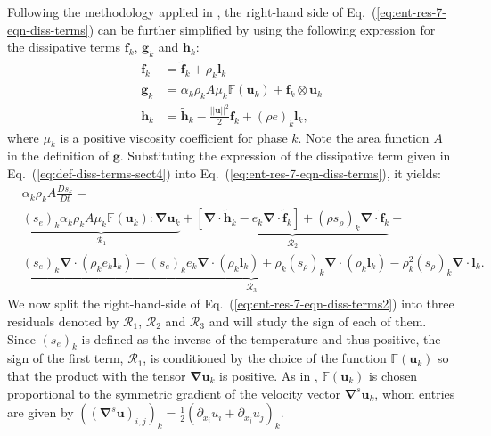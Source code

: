 \documentclass[preprint,10pt]{elsarticle}
\renewcommand{\div}{\mbold{\nabla}\! \cdot \!}
\newcommand{\grad}{\mbold{\nabla}}
\newcommand{\mbold}[1]{\boldsymbol#1}
\newcommand{\eqt}[1]{Eq.~(\ref{#1})}                     %
\begin{document}
Following the methodology applied in \cite{jlg, Marco_paper_low_mach}, the right-hand side of \eqt{eq:ent-res-7-eqn-diss-terms} can be further simplified by using the following expression
for the dissipative terms $\mbold f_k$,  $\mbold g_k$ and $\mbold h_k$:
%
\begin{subequations}\label{eq:def-diss-terms-sect4}
\begin{align}
  \mbold f_k &= \tilde{\mbold f}_k + \rho_k \mbold  l_k 
  \\
  \mbold g_k &= \alpha_k \rho_k A \mu_k \mathbb{F}(\mbold u_k) + \mbold f_k \otimes \mbold u_k
  \\
  \mbold h_k &= \tilde{\mbold h}_k - \frac{|| \mbold u||^2 }{2} \mbold f_k + (\rho e)_k \mbold l_k,
\end{align}
\end{subequations}
%
where $\mu_k$ is a positive viscosity coefficient for phase $k$. Note the area function $A$ in the definition of $\mbold g$. Substituting the expression of the dissipative term given in \eqt{eq:def-diss-terms-sect4} into \eqt{eq:ent-res-7-eqn-diss-terms}, it yields:
%
\begin{align}\label{eq:ent-res-7-eqn-diss-terms2}
&\alpha_k \rho_k A \frac{Ds_k}{Dt} = \nonumber \\
&\underbrace{\left(s_e\right)_k \alpha_k \rho_k A \mu_k \mathbb{F}(\mbold u_k) : \grad \mbold u_k}_{\mathcal{R}_1} +
\underbrace{\left[ \div \tilde{\mbold h}_k  - e_k \div \tilde{\mbold f}_k  \right] + (\rho s_\rho)_k \div \tilde{\mbold f}_k}_{\mathcal{R}_2} + \nonumber \\
&\underbrace{(s_e)_k \div \left( \rho_k e_k \mbold l_k \right) -  (s_e)_k e_k \div \left( \rho_k \mbold l_k \right) + \rho_k (s_\rho)_k \div \left( \rho_k \mbold l_k \right) 
  - \rho_k^2 (s_\rho)_k \div \mbold l_k}_{\mathcal{R}_3}.
\end{align}
%
We now split the right-hand-side of \eqt{eq:ent-res-7-eqn-diss-terms2} into three residuals denoted by $\mathcal{R}_1$, $\mathcal{R}_2$ and $\mathcal{R}_3$ and will study the sign of each of them. Since $(s_e)_k$ is defined as the inverse of the temperature and thus positive, the sign of the first term, $\mathcal{R}_1$, is conditioned by the choice of the function $\mathbb{F}(\mbold u_k)$ so that the product with the tensor $\grad \mbold u_k$ is positive. As in \cite{jlg, Marco_paper_low_mach}, $\mathbb{F}(\mbold u_k)$ is chosen proportional to the symmetric gradient of the velocity vector $\grad^s \mbold u_k$, whom entries are given by $\left( (\grad^s \mbold u)_{i,j} \right)_k = \frac{1}{2} \left( \partial_{x_i} u_i + \partial_{x_j} u_j \right)_k$. 
\end{document}
